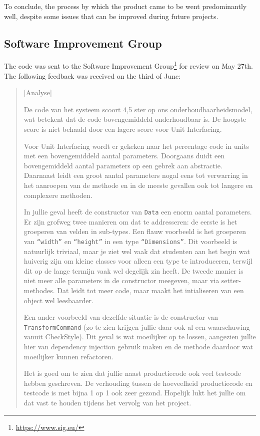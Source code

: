 To conclude, the process by which the product came to be went predominantly
well, despite some issues that can be improved during future projects.

\subsection{Software Improvement Group}
\label{ssec:sig}

The code was sent to the Software Improvement
Group\footnote{\url{https://www.sig.eu/}} for review on May 27th. The following
feedback was received on the third of June:

\begin{quotation}
[Analyse]

De code van het systeem scoort 4,5 ster op ons onderhoudbaarheidsmodel, wat
betekent dat de code bovengemiddeld onderhoudbaar is. De hoogste score is niet
behaald door een lagere score voor Unit Interfacing.

Voor Unit Interfacing wordt er gekeken naar het percentage code in units met een
bovengemiddeld aantal parameters. Doorgaans duidt een bovengemiddeld aantal
parameters op een gebrek aan abstractie. Daarnaast leidt een groot aantal
parameters nogal eens tot verwarring in het aanroepen van de methode en in de
meeste gevallen ook tot langere en complexere methoden.

In jullie geval heeft de constructor van \texttt{Data} een enorm aantal
parameters. Er zijn grofweg twee manieren om dat te addresseren: de eerste is
het groeperen van velden in sub-types. Een flauw voorbeeld is het groeperen van
\texttt{``width''} en \texttt{``height''} in een type \texttt{``Dimensions''}.
Dit voorbeeld is natuurlijk triviaal, maar je ziet wel vaak dat studenten aan
het begin wat huiverig zijn om kleine classes voor alleen een type te
introduceren, terwijl dit op de lange termijn vaak wel degelijk zin heeft. De
tweede manier is niet meer alle parameters in de constructor meegeven, maar via
setter-methodes. Dat leidt tot meer code, maar maakt het intialiseren van een
object wel leesbaarder.

Een ander voorbeeld van dezelfde situatie is de constructor van
\texttt{TransformCommand} (zo te zien krijgen jullie daar ook al een
waarschuwing vanuit CheckStyle). Dit geval is wat moeilijker op te lossen,
aangezien jullie hier van dependency injection gebruik maken en de methode
daardoor wat moeilijker kunnen refactoren.

Het is goed om te zien dat jullie naast productiecode ook veel testcode hebben
geschreven. De verhouding tussen de hoeveelheid productiecode en testcode is met
bijna 1 op 1 ook zeer gezond. Hopelijk lukt het jullie om dat vast te houden
tijdens het vervolg van het project.
\end{quotation}

